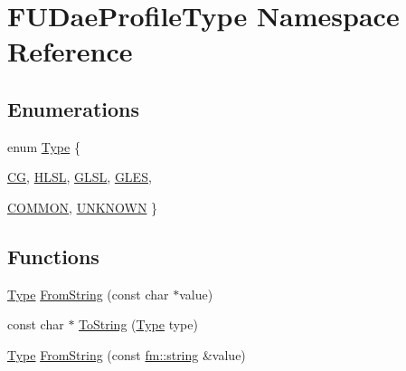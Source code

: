 \hypertarget{namespaceFUDaeProfileType}{
\section{FUDaeProfileType Namespace Reference}
\label{namespaceFUDaeProfileType}
}
\subsection*{Enumerations}
\begin{DoxyCompactItemize}
\item 
enum \hyperlink{namespaceFUDaeProfileType_ac10ea253a7a141708de2324a929f8a79}{Type} \{ \par
\hyperlink{namespaceFUDaeProfileType_ac10ea253a7a141708de2324a929f8a79ad2fb9414b1d238a825aeda1372b26f73}{CG}, 
\hyperlink{namespaceFUDaeProfileType_ac10ea253a7a141708de2324a929f8a79a03f09168ae46c4530fa846b65aa530c0}{HLSL}, 
\hyperlink{namespaceFUDaeProfileType_ac10ea253a7a141708de2324a929f8a79a7b4565c07ede3e0b9f758e04a365b25a}{GLSL}, 
\hyperlink{namespaceFUDaeProfileType_ac10ea253a7a141708de2324a929f8a79ad50a4f1509ee1cfabdf8832d6f5ab3ec}{GLES}, 
\par
\hyperlink{namespaceFUDaeProfileType_ac10ea253a7a141708de2324a929f8a79ad8aa33a3586c77ac1163a8840cf2ac38}{COMMON}, 
\hyperlink{namespaceFUDaeProfileType_ac10ea253a7a141708de2324a929f8a79a2f867276427b55b3b1fbe431943af7d3}{UNKNOWN}
 \}
\end{DoxyCompactItemize}
\subsection*{Functions}
\begin{DoxyCompactItemize}
\item 
\hyperlink{namespaceFUDaeProfileType_ac10ea253a7a141708de2324a929f8a79}{Type} \hyperlink{namespaceFUDaeProfileType_ada4366b94ef7f8e716d1aef37bb60b86}{FromString} (const char $\ast$value)
\item 
const char $\ast$ \hyperlink{namespaceFUDaeProfileType_ac07bd1059bb338bf6a10e422c7e9e057}{ToString} (\hyperlink{namespaceFUDaeProfileType_ac10ea253a7a141708de2324a929f8a79}{Type} type)
\item 
\hyperlink{namespaceFUDaeProfileType_ac10ea253a7a141708de2324a929f8a79}{Type} \hyperlink{namespaceFUDaeProfileType_a466913b35657ae0dde9695d4534595cf}{FromString} (const \hyperlink{classfm_1_1stringT}{fm::string} \&value)
\end{DoxyCompactItemize}


